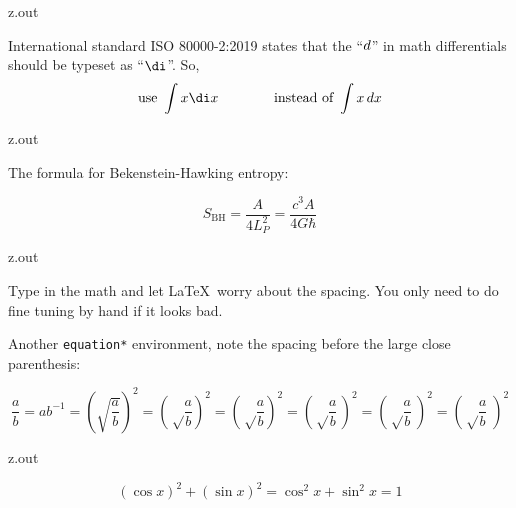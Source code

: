 \MyIO


\begin{VerbatimOut}{z.out}

International standard ISO 80000-2:2019 \cite{iso8000022019}
states that the ``$d\/$'' in math differentials
should be typeset as ``$\di$''.
So,
\begin{equation*}
  \text{use } \int x\di x\qquad\qquad \text{instead of } \int x\,dx
\end{equation*}
\end{VerbatimOut}

\MyIO


\begin{VerbatimOut}{z.out}

The formula for Bekenstein-Hawking entropy:

\begin{equation*}
  S_\text{BH}
  =
  \frac A {4L_P^2}
  = \frac {c^3A} {4G\hbar}
\end{equation*}
\end{VerbatimOut}

\MyIO


\begin{VerbatimOut}{z.out}

Type in the math and let \LaTeX\ worry about the spacing.
You only need to do fine tuning by hand if it looks bad.

Another \verb+equation*+ environment,
note the spacing before the large close parenthesis:

\begin{equation*}
  \frac ab
    = ab^{-1}
    = (\sqrt{\frac ab})^2
    = \left( \sqrt\frac ab \right)^2
    = \left( \sqrt\frac ab \!\right)^2
    = \left( \sqrt\frac ab \,\right)^2
    = \left( \sqrt\frac ab \:\right)^2
    = \left( \sqrt\frac ab \;\right)^2
\end{equation*}
\end{VerbatimOut}

\MyIO


\begin{VerbatimOut}{z.out}

\begin{equation*}
  (\cos x)^2 + (\sin x)^2 = \cos^2 x + \sin^2 x = 1
\end{equation*}
\end{VerbatimOut}

